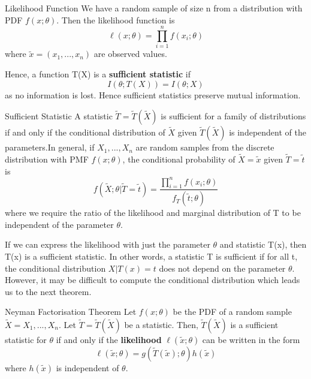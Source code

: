 \documentclass[twoside]{article}
\begin{document}
\begin{definition_exam}{Likelihood Function}{} We have a random sample of size n from a distribution with PDF $f(x;\theta)$. Then the likelihood function is 
$$
\ell(x;\theta) = \prod_{i=1}^nf(x_i;\theta)
$$
where $\tilde{x} = (x_1,...,x_n)$ are observed values.
\end{definition_exam}


Hence, a function T(X) is a \textbf{sufficient statistic} if 
$$
I(\theta;T(X)) = I(\theta;X)
$$
as no information is lost. Hence sufficient statistics preserve mutual information.

\begin{definition_exam}{Sufficient Statistic}{} A statistic $\tilde{T} = \tilde{T}(\tilde{X})$ is sufficient for a family of distributions if and only if the conditional distribution of $\tilde{X}$ given $\tilde{T}(\tilde{X})$ is independent of the parameters.\newline In general, if $X_1,...,X_n$ are random samples from the discrete distribution with PMF $f(x;\theta)$, the conditional probability of $\tilde{X} = \tilde{x}$ given $\tilde{T} = \tilde{t}$ is 
$$
f(\tilde{X}; \theta | \tilde{T} = \tilde{t}) = \frac{\prod_{i=1}^nf(x_i; \theta)}{f_T(\tilde{t}; \theta)}
$$
where we require the ratio of the likelihood and marginal distribution of T to be independent of the parameter $\theta$.
\end{definition_exam}

If we can express the likelihood with just the parameter $\theta$ and statistic T(x), then T(x) is a sufficient statistic. In other words, a statistic T is sufficient if for all t, the conditional distribution $X|T(x) = t$ does not depend on the parameter $\theta$.\\

However, it may be difficult to compute the conditional distribution which leads us to the next theorem.

\begin{theorem_exam}{Neyman Factorisation Theorem}{} Let $f(x; \theta)$ be the PDF of a random sample $\tilde{X} = X_1,...,X_n$. Let $\tilde{T} = \tilde{T}(\tilde{X})$ be a statistic. Then, $\tilde{T}(\tilde{X})$ is a sufficient statistic for $\theta$ if and only if the \textbf{likelihood} $\ell(\tilde{x}; \theta)$ can be written in the form 
$$
\ell(\tilde{x}; \theta) = g(\tilde{T}(\tilde{x}); \theta)h(\tilde{x})
$$
where $h(\tilde{x})$ is independent of $\theta$.
\end{theorem_exam}
\end{document}
